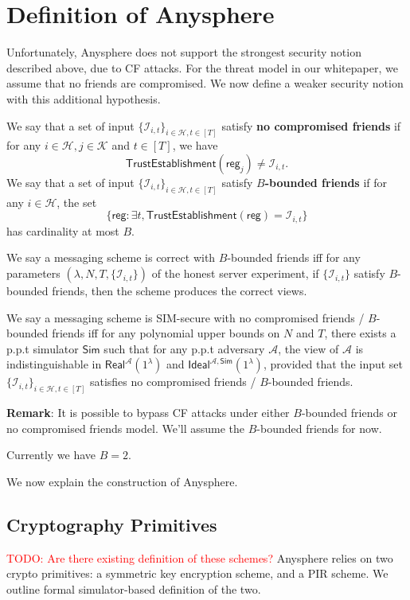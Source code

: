 \documentclass[sigconf, nonacm, balance=false, natbib=false, screen]{acmart}
\newcommand\todo[1]{\textcolor{red}{TODO: #1}}
\newcommand{\reg}{\mathsf{reg}}
\newcommand{\cK}{\mathcal{K}}
\newcommand{\Sim}{\mathsf{Sim}}
\newcommand{\cA}{\mathcal{A}}
\newcommand{\cI}{\mathcal{I}}
\newcommand{\cH}{\mathcal{H}}
\newcommand{\trust}{\mathsf{TrustEstablishment}}
\begin{document}
\section{Definition of Anysphere}
Unfortunately, Anysphere does not support the strongest security notion described above, due to CF attacks. For the threat model in our whitepaper, we assume that no friends are compromised. We now define a weaker security notion with this additional hypothesis.
\begin{definition}
We say that a set of input $\{\cI_{i, t}\}_{i \in \cH, t \in [T]}$ satisfy \textbf{no compromised friends} if for any $i \in \cH, j \in \cK$ and $t \in [T]$, we have
$$\trust(\reg_j) \neq \cI_{i, t}.$$
We say that a set of input $\{\cI_{i, t}\}_{i \in \cH, t \in [T]}$ satisfy \textbf{$B$-bounded friends} if for any $i \in \cH$, the set
$$\{\reg: \exists t, \trust(\reg) = \cI_{i, t}\}$$
has cardinality at most $B$.

We say a messaging scheme is correct with $B$-bounded friends iff for any parameters $(\lambda, N, T, \{\cI_{i, t}\})$ of the honest server experiment, if $\{\cI_{i, t}\}$ satisfy $B$-bounded friends, then the scheme produces the correct views.

We say a messaging scheme is SIM-secure with no compromised friends / $B$-bounded friends iff for any polynomial upper bounds on $N$ and $T$, there exists a p.p.t simulator $\Sim$ such that for any p.p.t adversary $\cA$, the view of $\cA$ is indistinguishable in $\mathsf{Real}^{\cA}(1^{\lambda})$ and $\mathsf{Ideal}^{\cA, \mathsf{\Sim}}(1^{\lambda})$, provided that the input set $\{\cI_{i, t}\}_{i \in \cH, t \in [T]}$ satisfies no compromised friends / $B$-bounded friends.
\end{definition}
\textbf{Remark}: It is possible to bypass CF attacks under either $B$-bounded friends or no compromised friends model. We'll assume the $B$-bounded friends for now.

Currently we have $B = 2$.

We now explain the construction of Anysphere. 
\subsection{Cryptography Primitives}
\todo{Are there existing definition of these schemes?}
Anysphere relies on two crypto primitives: a symmetric key encryption scheme, and a PIR scheme. We outline formal simulator-based definition of the two.
\end{document}

